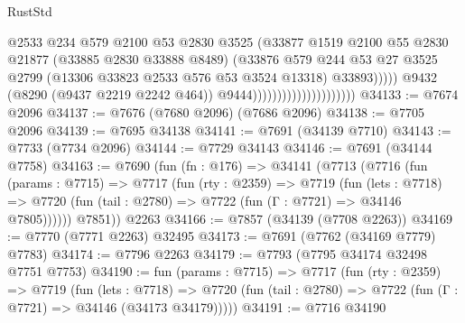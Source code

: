 \begin{lexlean}{RustStd}
\begin{coremodule}
                                                    @2533
                                                    @234
                                                    @579
                                                    @2100
                                                    @53
                                                    @2830
                                                    @3525
                                                    (@33877
                                                      @1519
                                                      @2100
                                                      @55
                                                      @2830
                                                      @21877
                                                      (@33885 @2830 @33888 @8489)
                                                      (@33876
                                                        @579
                                                        @244
                                                        @53
                                                        @27
                                                        @3525
                                                        @2799
                                                        (@13306 @33823 @2533 @576 @53 @3524 @13318)
                                                        @33893)))))
                                              @9432
                                              (@8290 (@9437 @2219 @2242 @464))
                                              @9444)))))))))))))))))))))
@34133 := @7674 @2096
@34137 := @7676 (@7680 @2096) (@7686 @2096)
@34138 := @7705 @2096
@34139 := @7695 @34138
@34141 := @7691 (@34139 @7710)
@34143 := @7733 (@7734 @2096)
@34144 := @7729 @34143
@34146 := @7691 (@34144 @7758)
@34163 := @7690
    (fun (fn : @176) =>
    @34141
      (@7713
        (@7716
          (fun (params : @7715) =>
          @7717
            (fun (rty : @2359) =>
            @7719
              (fun (lets : @7718) =>
              @7720 (fun (tail : @2780) => @7722 (fun (Γ : @7721) => @34146 @7805))))))
        @7851))
    @2263
@34166 := @7857 (@34139 (@7708 @2263))
@34169 := @7770 (@7771 @2263) @32495
@34173 := @7691 (@7762 (@34169 @7779) @7783)
@34174 := @7796 @2263
@34179 := @7793 (@7795 @34174 @32498 @7751 @7753)
@34190 := fun (params : @7715) =>
  @7717
    (fun (rty : @2359) =>
    @7719
      (fun (lets : @7718) =>
      @7720 (fun (tail : @2780) => @7722 (fun (Γ : @7721) => @34146 (@34173 @34179)))))
@34191 := @7716 @34190

\end{coremodule}
\end{lexlean}

